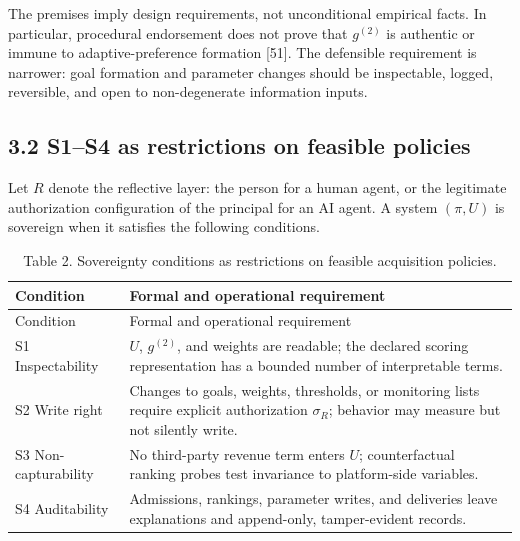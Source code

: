 \documentclass[
  11pt]{article}
\begin{document}
The premises imply design requirements, not unconditional empirical facts. In particular, procedural endorsement does not prove that \(g^{(2)}\) is authentic or immune to adaptive-preference formation {[}51{]}. The defensible requirement is narrower: goal formation and parameter changes should be inspectable, logged, reversible, and open to non-degenerate information inputs.

\subsection{3.2 S1--S4 as restrictions on feasible policies}\label{s1s4-as-restrictions-on-feasible-policies}

Let \(R\) denote the reflective layer: the person for a human agent, or the legitimate authorization configuration of the principal for an AI agent. A system \((\pi,U)\) is sovereign when it satisfies the following conditions.

\begin{longtable}[]{@{}
  >{\raggedright\arraybackslash}p{}
  >{\raggedright\arraybackslash}p{}@{}}
\caption{Table 2. Sovereignty conditions as restrictions on feasible acquisition policies.}\tabularnewline
\toprule\noalign{}
\begin{minipage}[b]{\linewidth}\raggedright
Condition
\end{minipage} & \begin{minipage}[b]{\linewidth}\raggedright
Formal and operational requirement
\end{minipage} \\
\midrule\noalign{}
\endfirsthead
\toprule\noalign{}
\begin{minipage}[b]{\linewidth}\raggedright
Condition
\end{minipage} & \begin{minipage}[b]{\linewidth}\raggedright
Formal and operational requirement
\end{minipage} \\
\midrule\noalign{}
\endhead
\bottomrule\noalign{}
\endlastfoot
S1 Inspectability & \(U\), \(g^{(2)}\), and weights are readable; the declared scoring representation has a bounded number of interpretable terms. \\
S2 Write right & Changes to goals, weights, thresholds, or monitoring lists require explicit authorization \(\sigma_R\); behavior may measure but not silently write. \\
S3 Non-capturability & No third-party revenue term enters \(U\); counterfactual ranking probes test invariance to platform-side variables. \\
S4 Auditability & Admissions, rankings, parameter writes, and deliveries leave explanations and append-only, tamper-evident records. \\
\end{longtable}
\end{document}
